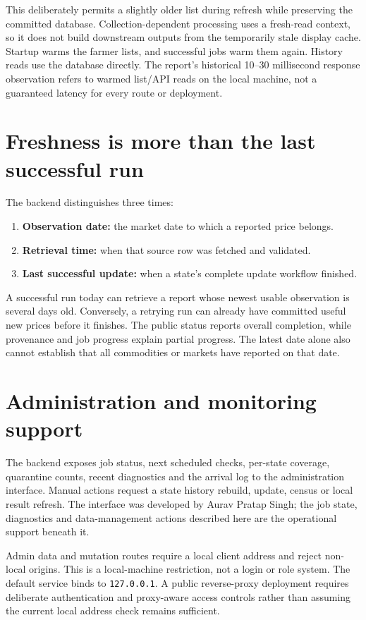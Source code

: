 \documentclass[12pt,a4paper,oneside]{report}
\newcommand{\auravname}{Aurav Pratap Singh}
\numberwithin{equation}{chapter}
\numberwithin{figure}{chapter}
\numberwithin{table}{chapter}
\theoremstyle{definition}
\begin{document}
This deliberately permits a slightly older list during refresh while preserving the committed database. Collection-dependent processing uses a fresh-read context, so it does not build downstream outputs from the temporarily stale display cache. Startup warms the farmer lists, and successful jobs warm them again. History reads use the database directly. The report's historical 10--30 millisecond response observation refers to warmed list/API reads on the local machine, not a guaranteed latency for every route or deployment.

\section{Freshness is more than the last successful run}
The backend distinguishes three times:
\begin{enumerate}
  \item \textbf{Observation date:} the market date to which a reported price belongs.
  \item \textbf{Retrieval time:} when that source row was fetched and validated.
  \item \textbf{Last successful update:} when a state's complete update workflow finished.
\end{enumerate}
A successful run today can retrieve a report whose newest usable observation is several days old. Conversely, a retrying run can already have committed useful new prices before it finishes. The public status reports overall completion, while provenance and job progress explain partial progress. The latest date alone also cannot establish that all commodities or markets have reported on that date.

\section{Administration and monitoring support}
The backend exposes job status, next scheduled checks, per-state coverage, quarantine counts, recent diagnostics and the arrival log to the administration interface. Manual actions request a state history rebuild, update, census or local result refresh. The interface was developed by \auravname; the job state, diagnostics and data-management actions described here are the operational support beneath it.

Admin data and mutation routes require a local client address and reject non-local origins. This is a local-machine restriction, not a login or role system. The default service binds to \texttt{127.0.0.1}. A public reverse-proxy deployment requires deliberate authentication and proxy-aware access controls rather than assuming the current local address check remains sufficient.
\end{document}

